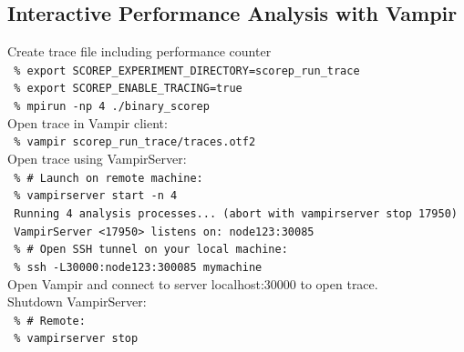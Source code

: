 \subsection{Interactive Performance Analysis with Vampir}
Create trace file including performance counter\\
\texttt{ \% export SCOREP\_EXPERIMENT\_DIRECTORY=scorep\_run\_trace}\\
\texttt{ \% export SCOREP\_ENABLE\_TRACING=true}\\
\texttt{ \% mpirun -np 4 ./binary\_scorep}\\[2ex]

Open trace in Vampir client:\\
\texttt{ \% vampir scorep\_run\_trace/traces.otf2}\\[2ex]

Open trace using VampirServer:\\
\texttt{ \% \# Launch on remote machine:}\\
\texttt{ \% vampirserver start -n 4 }\\
\texttt{ Running 4 analysis processes... (abort with vampirserver stop 17950)}\\
\texttt{ VampirServer <17950> listens on: node123:30085}\\
\texttt{ \% \# Open SSH tunnel on your local machine:}\\
\texttt{ \% ssh -L30000:node123:300085 mymachine}\\[2ex]
Open Vampir and connect to server localhost:30000 to open trace.\\[2ex]

Shutdown VampirServer:\\
\texttt{ \% \# Remote:}\\
\texttt{ \% vampirserver stop}



\vfill
\pagebreak

